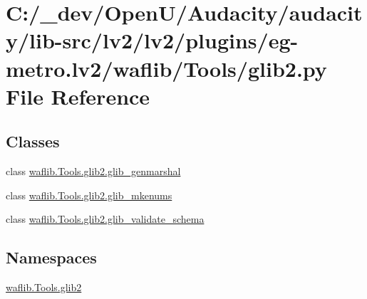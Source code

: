 \hypertarget{lv2_2plugins_2eg-metro_8lv2_2waflib_2_tools_2glib2_8py}{}\section{C\+:/\+\_\+dev/\+Open\+U/\+Audacity/audacity/lib-\/src/lv2/lv2/plugins/eg-\/metro.lv2/waflib/\+Tools/glib2.py File Reference}
\label{lv2_2plugins_2eg-metro_8lv2_2waflib_2_tools_2glib2_8py}
\subsection*{Classes}
\begin{DoxyCompactItemize}
\item 
class \hyperlink{classwaflib_1_1_tools_1_1glib2_1_1glib__genmarshal}{waflib.\+Tools.\+glib2.\+glib\+\_\+genmarshal}
\item 
class \hyperlink{classwaflib_1_1_tools_1_1glib2_1_1glib__mkenums}{waflib.\+Tools.\+glib2.\+glib\+\_\+mkenums}
\item 
class \hyperlink{classwaflib_1_1_tools_1_1glib2_1_1glib__validate__schema}{waflib.\+Tools.\+glib2.\+glib\+\_\+validate\+\_\+schema}
\end{DoxyCompactItemize}
\subsection*{Namespaces}
\begin{DoxyCompactItemize}
\item 
 \hyperlink{namespacewaflib_1_1_tools_1_1glib2}{waflib.\+Tools.\+glib2}
\end{DoxyCompactItemize}
